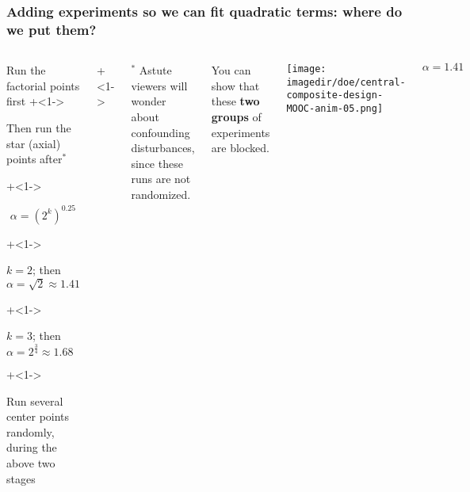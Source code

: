 \begin{frame}\frametitle{Adding experiments so we can fit quadratic terms: where do we put them?}
	\begin{columns}[T]
		
			\vspace{1cm}
			
			\begin{itemize}
				\item	Run the factorial points first
				\onslide+<1->{
					\item	Then run the star (axial) points after$^\ast$
				}
				\onslide+<1->{
					\Large
					\[\alpha  = \left(2^k\right)^{0.25}\]
					
			
					\begin{itemize}
						\onslide+<1->{\item	$k = 2$; then $\alpha = \sqrt{2} \approx 1.41$ }
						\onslide+<1->{\item	$k = 3$; then $\alpha = 2^{\tfrac{3}{4}} \approx 1.68$}
					\end{itemize}
					\normalsize
				}
				\onslide+<1->{
					\item	Run several center points randomly, during the above two stages
				}
			\end{itemize}
			
			\onslide+<1->{
				\vspace{0cm}
				\tiny
				$^\ast$ Astute viewers will wonder about confounding disturbances, since these runs are not randomized.
			
				You can show that these {\color[rgb]{0,0.5,1}\textbf{two}} {\color[rgb]{0.5,0, 0.5}\textbf{groups}} of experiments are blocked.
			}
			
			
			\centerline{\texttt{[image: \\imagedir/doe/central-composite-design-MOOC-anim-05.png]}}
			
			\vspace{-0.5cm}
			\[\alpha = 1.41\]
	\end{columns}
\end{frame}

